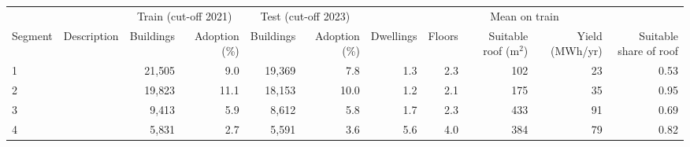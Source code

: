 \begin{tabular}{llrrrrrrrrr}
\toprule
 & & \multicolumn{2}{c}{Train (cut-off 2021)} & \multicolumn{2}{c}{Test (cut-off 2023)} & \multicolumn{5}{c}{Mean on train} \\
\cmidrule(lr){3-4} \cmidrule(lr){5-6} \cmidrule(lr){7-11}
Segment & Description & Buildings & Adoption (\%) & Buildings & Adoption (\%) & Dwellings & Floors & Suitable roof (m$^2$) & Yield (MWh/yr) & Suitable share of roof \\
\midrule
1 &  & 21{,}505 & 9.0 & 19{,}369 & 7.8 & 1.3 & 2.3 & 102 & 23 & 0.53 \\
2 &  & 19{,}823 & 11.1 & 18{,}153 & 10.0 & 1.2 & 2.1 & 175 & 35 & 0.95 \\
3 &  & 9{,}413 & 5.9 & 8{,}612 & 5.8 & 1.7 & 2.3 & 433 & 91 & 0.69 \\
4 &  & 5{,}831 & 2.7 & 5{,}591 & 3.6 & 5.6 & 4.0 & 384 & 79 & 0.82 \\
\bottomrule
\end{tabular}
